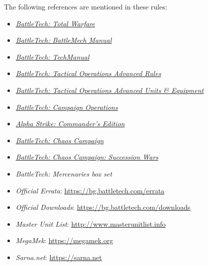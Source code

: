 The following references are mentioned in these rules:

\begin{itemize}

\item \emph{\href{https://store.catalystgamelabs.com/products/battletech-total-warfare-pdf}{BattleTech: Total Warfare}}

\item \emph{\href{https://store.catalystgamelabs.com/products/battletech-battlemech-manual-book-pdf-combo}{BattleTech: BattleMech Manual}}

\item \emph{\href{https://store.catalystgamelabs.com/products/battletech-techmanual-book-pdf}{BattleTech: TechManual}}

\item \emph{\href{https://store.catalystgamelabs.com/products/battletech-tactical-operations-advanced-rules}{BattleTech: Tactical Operations Advanced Rules}}

\item \emph{\href{https://store.catalystgamelabs.com/products/battletech-tactical-operations-advanced-units-equipement}{BattleTech: Tactical Operations Advanced Units \& Equipment}}

\item \emph{\href{https://store.catalystgamelabs.com/products/battletech-campaign-operations-pdf}{BattleTech: Campaign Operations}}

\item \emph{\href{https://store.catalystgamelabs.com/products/battletech-alpha-strike-commanders-edition}{Alpha Strike: Commander's Edition}}

\item \emph{\href{http://bg.battletech.com/download/CAT35600_ChaosCampaign_Rulebook.pdf}{BattleTech: Chaos Campaign}}

\item \emph{\href{https://store.catalystgamelabs.com/products/battletech-chaos-campaign-succession-wars}{BattleTech: Chaos Campaign: Succession Wars}}

\item \emph{BattleTech: Mercenaries box set}

\item \emph{Official Errata}: \href{https://bg.battletech.com/errata}{https://bg.battletech.com/errata}

\item \emph{Official Downloads}: \href{https://bg.battletech.com/downloads}{https://bg.battletech.com/downloads}

\item \emph{Master Unit List}: \href{http://www.masterunitlist.info}{http://www.masterunitlist.info}

\item \emph{MegaMek}: \href{https://megamek.org}{https://megamek.org}

\item \emph{Sarna.net}: \href{https://sarna.net}{https://sarna.net}

\end{itemize}

